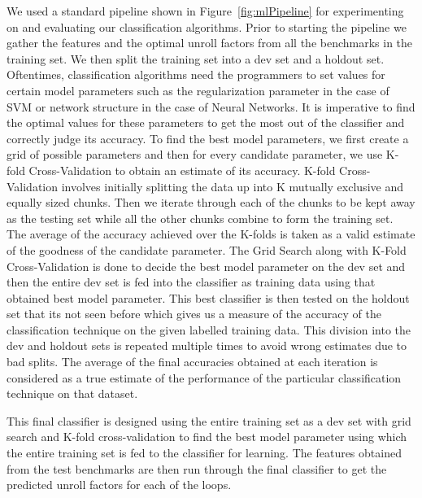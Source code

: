 \documentclass[]{sig-alternate}
\begin{document}
We used a standard pipeline shown in Figure~\ref{fig:mlPipeline} for experimenting on and evaluating our classification algorithms. Prior to starting the pipeline we gather the features and the optimal unroll factors from all the benchmarks in the training set. We then split the training set into a dev set and a holdout set. Oftentimes, classification algorithms need the programmers to set values for certain model parameters such as the regularization parameter in the case of SVM or network structure in the case of Neural Networks. It is imperative to find the optimal values for these parameters to get the most out of the classifier and correctly judge its accuracy. To find the best model parameters, we first create a grid of possible parameters and then for every candidate parameter, we use K-fold Cross-Validation to obtain an estimate of its accuracy. K-fold Cross-Validation involves initially splitting the data up into K mutually exclusive and equally sized chunks. Then we iterate through each of the chunks to be kept away as the testing set while all the other chunks combine to form the training set. The average of the accuracy achieved over the K-folds is taken as a valid estimate of the goodness of the candidate parameter. The Grid Search along with K-Fold Cross-Validation is done to decide the best model parameter on the dev set and then the entire dev set is fed into the classifier as training data using that obtained best model parameter. This best classifier is then tested on the holdout set that its not seen before which gives us a measure of the accuracy of the classification technique on the given labelled training data. This division into the dev and holdout sets is repeated multiple times to avoid wrong estimates due to bad splits. The average of the final accuracies obtained at each iteration is considered as a true estimate of the performance of the particular classification technique on that dataset. 

This final classifier is designed using the entire training set as a dev set with grid search and K-fold cross-validation to find the best model parameter using which the entire training set is fed to the classifier for learning. The features obtained from the test benchmarks are then run through the final classifier to get the predicted unroll factors for each of the loops. 
\end{document}
